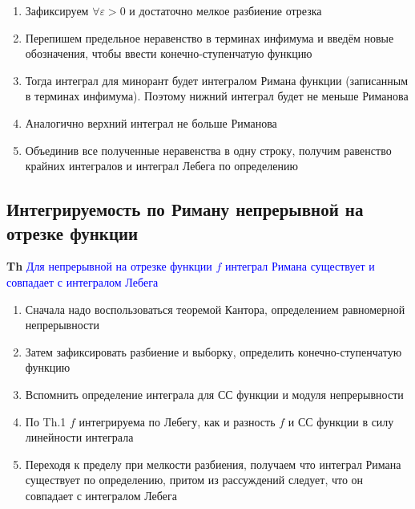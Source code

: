 \begin{enumerate}
    \item Зафиксируем $\forall \varepsilon > 0$ и достаточно мелкое разбиение отрезка
    \item Перепишем предельное неравенство в терминах инфимума и введём новые обозначения, чтобы ввести
    конечно-ступенчатую функцию
    \item Тогда интеграл для минорант будет интегралом Римана функции (записанным в терминах инфимума).
    Поэтому нижний интеграл будет не меньше Риманова
    \item Аналогично верхний интеграл не больше Риманова
    \item Объединив все полученные неравенства в одну строку, получим равенство крайних интегралов и интеграл
    Лебега по определению
\end{enumerate}

\subsection{Интегрируемость по Риману непрерывной на отрезке функции}

\textbf{Th} \textcolor{blue}{Для непрерывной на отрезке функции $f$ интеграл Римана существует и совпадает с
интегралом Лебега}

\begin{enumerate}
    \item Сначала надо воспользоваться теоремой Кантора, определением равномерной непрерывности
    \item Затем зафиксировать разбиение и выборку, определить конечно-ступенчатую функцию
    \item Вспомнить определение интеграла для СС функции и модуля непрерывности
    \item По Th.1 $f$ интегрируема по Лебегу, как и разность $f$ и СС функции в силу линейности интеграла
    \item Переходя к пределу при мелкости разбиения, получаем что интеграл Римана существует по определению,
    притом из рассуждений следует, что он совпадает с интегралом Лебега
\end{enumerate}